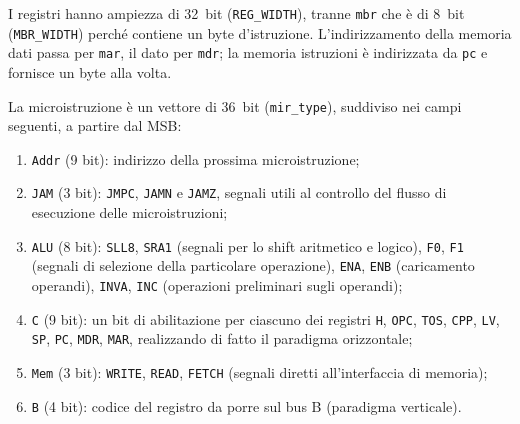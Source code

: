 I registri hanno ampiezza di \SI{32}{bit} (\texttt{REG\_WIDTH}), tranne \texttt{mbr} che è di \SI{8}{bit} (\texttt{MBR\_WIDTH}) perché contiene un byte d'istruzione. L'indirizzamento della memoria dati passa per \texttt{mar}, il dato per \texttt{mdr}; la memoria istruzioni è indirizzata da \texttt{pc} e fornisce un byte alla volta.

La microistruzione è un vettore di \SI{36}{bit} (\texttt{mir\_type}), suddiviso nei campi seguenti, a partire dal MSB:
\begin{enumerate}
  \item \texttt{Addr} (9 bit): indirizzo della prossima microistruzione;
  \item \texttt{JAM} (3 bit): \texttt{JMPC}, \texttt{JAMN} e \texttt{JAMZ}, segnali utili al controllo del flusso di esecuzione delle microistruzioni;
  \item \texttt{ALU} (8 bit): \texttt{SLL8}, \texttt{SRA1} (segnali per lo shift aritmetico e logico), \texttt{F0}, \texttt{F1} (segnali di selezione della particolare operazione), \texttt{ENA}, \texttt{ENB} (caricamento operandi), \texttt{INVA}, \texttt{INC} (operazioni preliminari sugli operandi);
  \item \texttt{C} (9 bit): un bit di abilitazione per ciascuno dei registri \texttt{H}, \texttt{OPC}, \texttt{TOS}, \texttt{CPP}, \texttt{LV}, \texttt{SP}, \texttt{PC}, \texttt{MDR}, \texttt{MAR}, realizzando di fatto il paradigma orizzontale;
  \item \texttt{Mem} (3 bit): \texttt{WRITE}, \texttt{READ}, \texttt{FETCH} (segnali diretti all'interfaccia di memoria);
  \item \texttt{B} (4 bit): codice del registro da porre sul bus B (paradigma verticale).
\end{enumerate}



